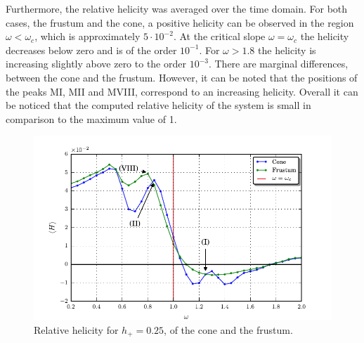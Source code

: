 Furthermore, the relative helicity was averaged over the time domain.
For both cases, the frustum and the cone, a positive helicity can be observed in the region $\omega<\omega_c$, which is
approximately $5\cdot 10^{-2}$.
At the critical slope $\omega=\omega_c$ the helicity decreases below zero and is of the order $10^{-1}$.
For $\omega>1.8$ the helicity is increasing slightly above zero to the order $10^{-3}$.
There are marginal differences, between the cone and the frustum.
However, it can be noted that the positions of the peaks M\RN{1}, M\RN{2} and M\RN{8},
correspond to an increasing helicity.
Overall it can be noticed that the computed relative helicity of the system is small in
comparison to the maximum value of 1.

\begin{figure}[!b]
  \centering
  \includegraphics{gfx/cone/final/helicity.pdf}
  \caption{
      \label{fig:cone:finalhelicity}
      Relative helicity for $h_+=0.25$, of the cone and the frustum.
    }
\end{figure}

\clearpage

